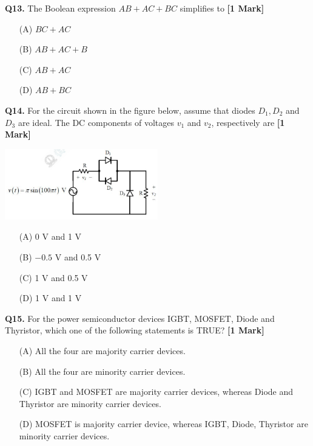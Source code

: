 \documentclass[11pt]{article}
\newcommand{\questiona}[2]{
    \noindent\textbf{Q#2.} #1 \hfill \textbf{[1 Mark]}
}
\begin{document}
\questiona{The Boolean expression \( AB + AC + BC \) simplifies to}{13}
\begin{enumerate}
    \item[(A)] \( BC + AC \)  
    \item[(B)] \( AB + AC + B \)  
    \item[(C)] \( AB + AC \)  
    \item[(D)] \( AB + BC \)  
\end{enumerate}
\vspace{0.5cm}

\questiona{For the circuit shown in the figure below, assume that diodes \( D_1, D_2 \) and \( D_3 \) are ideal. The DC components of voltages \( v_1 \) and \( v_2 \), respectively are}{14}
\begin{center}
\includegraphics[width=0.5\textwidth]{figures/14.png}
\end{center}
\begin{enumerate}
    \item[(A)] 0 V and 1 V  
    \item[(B)] \(-0.5\) V and 0.5 V  
    \item[(C)] 1 V and 0.5 V  
    \item[(D)] 1 V and 1 V  
\end{enumerate}
\vspace{0.5cm}

\questiona{For the power semiconductor devices IGBT, MOSFET, Diode and Thyristor, which one of the following statements is TRUE?}{15}
\begin{enumerate}
    \item[(A)] All the four are majority carrier devices.  
    \item[(B)] All the four are minority carrier devices.  
    \item[(C)] IGBT and MOSFET are majority carrier devices, whereas Diode and Thyristor are minority carrier devices.  
    \item[(D)] MOSFET is majority carrier device, whereas IGBT, Diode, Thyristor are minority carrier devices.  
\end{enumerate}
\vspace{0.5cm}
\end{document}
